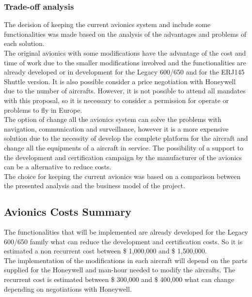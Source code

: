 \subsubsection{Trade-off analysis}
The decision of keeping the current avionics system and include some functionalities was made based on the analysis of the advantages and problems of each solution.
\\The original avionics with some modifications have the advantage of the cost and time of work due to the smaller modifications involved and the functionalities are already developed or in development for the Legacy 600/650 and for the ERJ145 Shuttle version. It is also possible consider a price negotiation with Honeywell due to the number of aircrafts. However, it is not possible to attend all mandates with this proposal, so it is necessary to consider a permission for operate or problems to fly in Europe.
\\The option of change all the avionics system can solve the problems with navigation, communication and surveillance, however it is a more expensive solution due to the necessity of develop the complete platform for the aircraft and change all the equipments of a aircraft in service. The possibility of a support to the development and certification campaign by the manufacturer of the avionics can be a alternative to reduce costs.
\\The choice for keeping the current avionics was based on a comparison between the presented analysis and the business model of the project.



\subsection{Avionics Costs Summary}
The functionalities that will be implemented are already developed for the Legacy 600/650 family what can reduce the development and certification costs. So it is estimated a non recurrent cost between \$ 1,000,000 and \$ 1,500,000.
\\The implementation of the modifications in each aircraft will depend on the parts supplied for the Honeywell and man-hour needed to modify the aircrafts. The recurrent cost is estimated between \$ 300,000 and \$ 400,000 what can change depending on negotiations with Honeywell.


\begin{figure}[H] %
\label{fig:AVIOCostSum1}
\end{figure}

